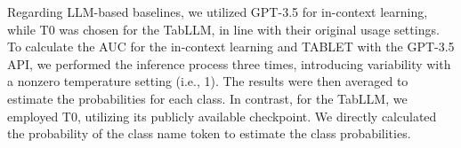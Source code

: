 \documentclass{article}
\theoremstyle{plain}
\theoremstyle{definition}
\theoremstyle{remark}
\begin{document}
Regarding LLM-based baselines, we utilized GPT-3.5 for in-context learning, while T0 was chosen for the TabLLM, in line with their original usage settings. To calculate the AUC for the in-context learning and TABLET with the GPT-3.5 API, we performed the inference process three times, introducing variability with a nonzero temperature setting (i.e., 1). The results were then averaged to estimate the probabilities for each class. In contrast, for the TabLLM, we employed T0, utilizing its publicly available checkpoint. We directly calculated the probability of the class name token to estimate the class probabilities.

\end{document}
